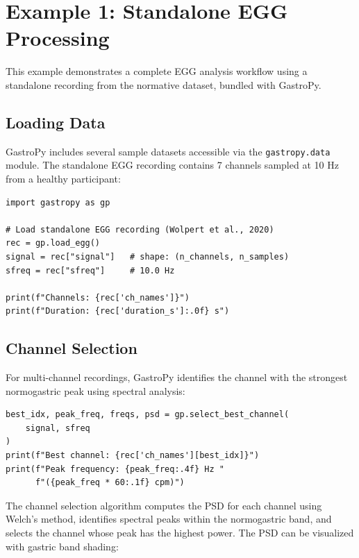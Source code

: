 \documentclass[12pt]{article}
\begin{document}
\section{Example 1: Standalone EGG Processing}

This example demonstrates a complete EGG analysis workflow using a standalone
recording from the \citet{Wolpert2020} normative dataset, bundled with
GastroPy.

\subsection{Loading Data}

GastroPy includes several sample datasets accessible via the
\texttt{gastropy.data} module. The standalone EGG recording contains 7 channels
sampled at 10 Hz from a healthy participant:

\begin{lstlisting}
import gastropy as gp

# Load standalone EGG recording (Wolpert et al., 2020)
rec = gp.load_egg()
signal = rec["signal"]   # shape: (n_channels, n_samples)
sfreq = rec["sfreq"]     # 10.0 Hz

print(f"Channels: {rec['ch_names']}")
print(f"Duration: {rec['duration_s']:.0f} s")
\end{lstlisting}

\subsection{Channel Selection}

For multi-channel recordings, GastroPy identifies the channel with the
strongest normogastric peak using spectral analysis:

\begin{lstlisting}
best_idx, peak_freq, freqs, psd = gp.select_best_channel(
    signal, sfreq
)
print(f"Best channel: {rec['ch_names'][best_idx]}")
print(f"Peak frequency: {peak_freq:.4f} Hz "
      f"({peak_freq * 60:.1f} cpm)")
\end{lstlisting}

The channel selection algorithm computes the PSD for each channel using
Welch's method, identifies spectral peaks within the normogastric band, and
selects the channel whose peak has the highest power. The PSD can be
visualized with gastric band shading:
\end{document}
